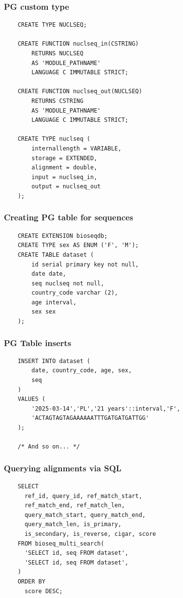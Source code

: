\begin{frame}[fragile]
  \frametitle{PG custom type}
  \begin{verbatim}
    CREATE TYPE NUCLSEQ;

    CREATE FUNCTION nuclseq_in(CSTRING)
        RETURNS NUCLSEQ
        AS 'MODULE_PATHNAME'
        LANGUAGE C IMMUTABLE STRICT;

    CREATE FUNCTION nuclseq_out(NUCLSEQ)
        RETURNS CSTRING
        AS 'MODULE_PATHNAME'
        LANGUAGE C IMMUTABLE STRICT;

    CREATE TYPE nuclseq (
        internallength = VARIABLE,
        storage = EXTENDED,
        alignment = double,
        input = nuclseq_in,
        output = nuclseq_out
    );
  \end{verbatim}
\end{frame}

\begin{frame}[fragile]
  \frametitle{Creating PG table for sequences}
  \begin{verbatim}
    CREATE EXTENSION bioseqdb;
    CREATE TYPE sex AS ENUM ('F', 'M');
    CREATE TABLE dataset (
        id serial primary key not null,
        date date,
        seq nuclseq not null,
        country_code varchar (2),
        age interval,
        sex sex
    );
  \end{verbatim}
\end{frame}

\begin{frame}[fragile]
  \frametitle{PG Table inserts}
  \begin{verbatim}
    INSERT INTO dataset (
        date, country_code, age, sex,
        seq
    )
    VALUES (
        '2025-03-14','PL','21 years'::interval,'F',
        'ACTAGTAGTAGAAAAAATTTGATGATGATTGG'
    );

    /* And so on... */
  \end{verbatim}
\end{frame}

\begin{frame}[fragile]
  \frametitle{Querying alignments via SQL}
  \begin{verbatim}
    SELECT
      ref_id, query_id, ref_match_start,
      ref_match_end, ref_match_len,
      query_match_start, query_match_end,
      query_match_len, is_primary,
      is_secondary, is_reverse, cigar, score
    FROM bioseq_multi_search(
      'SELECT id, seq FROM dataset',
      'SELECT id, seq FROM dataset',
    )
    ORDER BY
      score DESC;
  \end{verbatim}
\end{frame}

